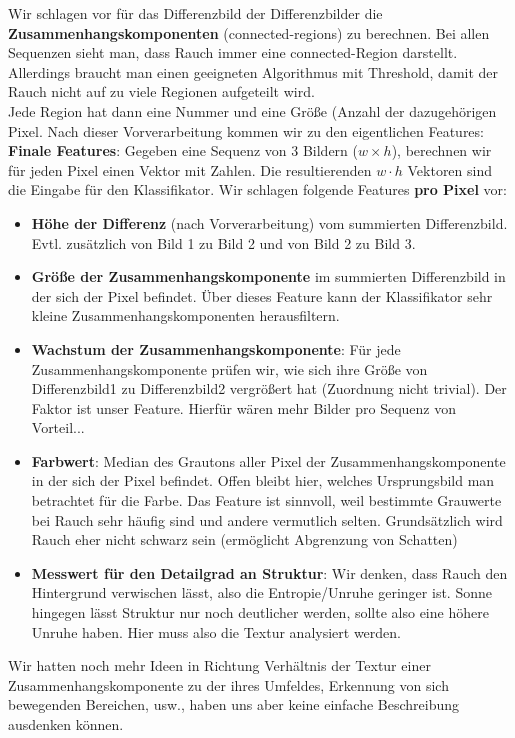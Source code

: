 \documentclass{article}
\begin{document}
Wir schlagen vor für das Differenzbild der Differenzbilder die \textbf{Zusammenhangskomponenten} (connected-regions) zu berechnen. Bei allen Sequenzen sieht man, dass Rauch immer eine connected-Region darstellt. Allerdings braucht man einen geeigneten Algorithmus mit Threshold, damit der Rauch nicht auf zu viele Regionen aufgeteilt wird.\\
Jede Region hat dann eine Nummer und eine Größe (Anzahl der dazugehörigen Pixel. Nach dieser Vorverarbeitung kommen wir zu den eigentlichen Features:\\

\textbf{Finale Features}: Gegeben eine Sequenz von 3 Bildern ($w \times h$), berechnen wir für jeden Pixel einen Vektor mit Zahlen. Die resultierenden $w \cdot h$ Vektoren sind die Eingabe für den Klassifikator. Wir schlagen folgende Features \textbf{pro Pixel} vor:
\begin{itemize}
\item \textbf{Höhe der Differenz} (nach Vorverarbeitung) vom summierten Differenzbild. Evtl. zusätzlich von Bild 1 zu Bild 2 und von Bild 2 zu Bild 3.
\item \textbf{Größe der Zusammenhangskomponente} im summierten Differenzbild in der sich der Pixel befindet. Über dieses Feature kann der Klassifikator sehr kleine Zusammenhangskomponenten herausfiltern.
\item \textbf{Wachstum der Zusammenhangskomponente}: Für jede Zusammenhangskomponente prüfen wir, wie sich ihre Größe von Differenzbild1 zu Differenzbild2 vergrößert hat (Zuordnung nicht trivial). Der Faktor ist unser Feature. Hierfür wären mehr Bilder pro Sequenz von Vorteil...
\item \textbf{Farbwert}: Median des Grautons aller Pixel der Zusammenhangskomponente in der sich der Pixel befindet. Offen bleibt hier, welches Ursprungsbild man betrachtet für die Farbe. Das Feature ist sinnvoll, weil bestimmte Grauwerte bei Rauch sehr häufig sind und andere vermutlich selten. Grundsätzlich wird Rauch eher nicht schwarz sein (ermöglicht Abgrenzung von Schatten)
\item \textbf{Messwert für den Detailgrad an Struktur}: Wir denken, dass Rauch den Hintergrund verwischen lässt, also die Entropie/Unruhe geringer ist. Sonne hingegen lässt Struktur nur noch deutlicher werden, sollte also eine höhere Unruhe haben. Hier muss also die Textur analysiert werden.
\end{itemize}

Wir hatten noch mehr Ideen in Richtung Verhältnis der Textur einer Zusammenhangskomponente zu der ihres Umfeldes, Erkennung von sich bewegenden Bereichen, usw., haben uns aber keine einfache Beschreibung ausdenken können.
\end{document}
